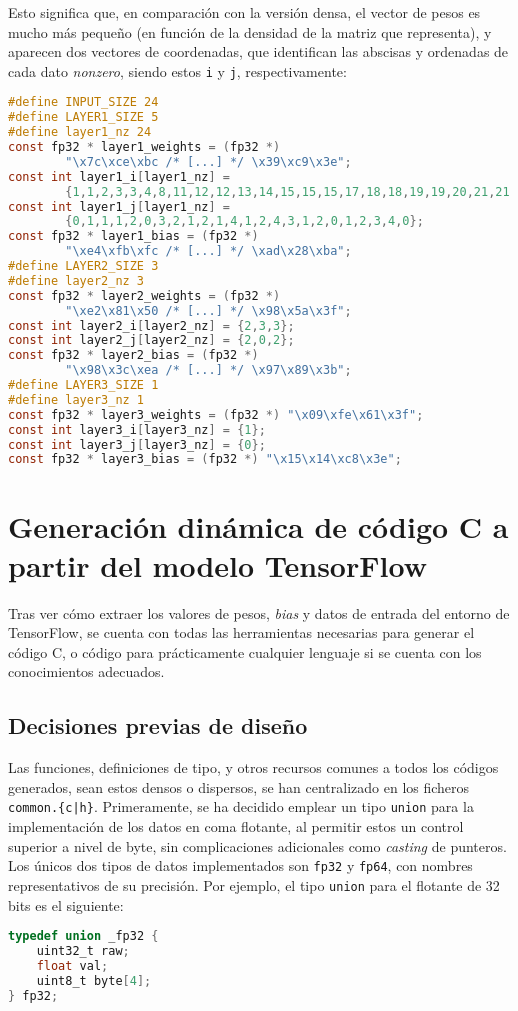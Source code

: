 Esto significa que, en comparación con la versión densa, el vector de pesos es mucho más pequeño (en función de la densidad de la matriz que representa), y aparecen dos vectores de coordenadas, que identifican las abscisas y ordenadas de cada dato \textit{nonzero}, siendo estos \texttt{i} y \texttt{j}, respectivamente:\medskip
\begin{lstlisting}[language=C]
#define INPUT_SIZE 24
#define LAYER1_SIZE 5
#define layer1_nz 24
const fp32 * layer1_weights = (fp32 *)
        "\x7c\xce\xbc /* [...] */ \x39\xc9\x3e";
const int layer1_i[layer1_nz] =
        {1,1,2,3,3,4,8,11,12,12,13,14,15,15,15,17,18,18,19,19,20,21,21,23};
const int layer1_j[layer1_nz] =
        {0,1,1,1,2,0,3,2,1,2,1,4,1,2,4,3,1,2,0,1,2,3,4,0};
const fp32 * layer1_bias = (fp32 *)
        "\xe4\xfb\xfc /* [...] */ \xad\x28\xba";
#define LAYER2_SIZE 3
#define layer2_nz 3
const fp32 * layer2_weights = (fp32 *)
        "\xe2\x81\x50 /* [...] */ \x98\x5a\x3f";
const int layer2_i[layer2_nz] = {2,3,3};
const int layer2_j[layer2_nz] = {2,0,2};
const fp32 * layer2_bias = (fp32 *)
        "\x98\x3c\xea /* [...] */ \x97\x89\x3b";
#define LAYER3_SIZE 1
#define layer3_nz 1
const fp32 * layer3_weights = (fp32 *) "\x09\xfe\x61\x3f";
const int layer3_i[layer3_nz] = {1};
const int layer3_j[layer3_nz] = {0};
const fp32 * layer3_bias = (fp32 *) "\x15\x14\xc8\x3e";
\end{lstlisting}


\section{Generación dinámica de código C a partir del modelo TensorFlow}
\label{sec:generacion_din_modelo_tf}
Tras ver cómo extraer los valores de pesos, \textit{bias} y datos de entrada del entorno de TensorFlow, se cuenta con todas las herramientas necesarias para generar el código C, o código para prácticamente cualquier lenguaje si se cuenta con los conocimientos adecuados.

\subsection{Decisiones previas de diseño}
\label{ssec:decisiones_previas_diseno}
Las funciones, definiciones de tipo, y otros recursos comunes a todos los códigos generados, sean estos densos o dispersos, se han centralizado en los ficheros \texttt{common.\{c|h\}}. Primeramente, se ha decidido emplear un tipo \texttt{union} para la implementación de los datos en coma flotante, al permitir estos un control superior a nivel de byte, sin complicaciones adicionales como \textit{casting} de punteros. Los únicos dos tipos de datos implementados son \texttt{fp32} y \texttt{fp64}, con nombres representativos de su precisión. Por ejemplo, el tipo \texttt{union} para el flotante de 32 bits es el siguiente:\medskip
\begin{lstlisting}[language=C]
typedef union _fp32 {
    uint32_t raw;
    float val;
    uint8_t byte[4];
} fp32;
\end{lstlisting}

